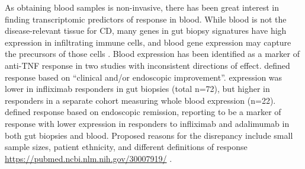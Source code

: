 As obtaining blood samples is non-invasive, there has been great interest in finding transcriptomic predictors of response in blood.
%
While blood is not the disease-relevant tissue for \gls{CD},
many genes in gut biopsy signatures have high expression in infiltrating immune cells, and blood gene expression may capture the precursors of those cells \autocite{gaujoux2019CellcentredMetaanalysisReveals}.
Blood  expression has been identified as a marker of anti-\gls{TNF} response in two studies with inconsistent directions of effect.
\textcite{gaujoux2019CellcentredMetaanalysisReveals} defined response based on  
\enquote{clinical and/or endoscopic improvement}.
 expression was lower in infliximab responders in gut biopsies (total n=72),
but higher in responders in a separate cohort measuring whole blood expression (n=22).
\textcite{verstockt2019LowTREM1Expression} defined response based on endoscopic remission, reporting  to be a marker of response 
with lower expression in responders to infliximab and adalimumab in both gut biopsies and blood.
Proposed reasons for the disrepancy include small sample sizes, patient ethnicity, and different definitions of response \url{https://pubmed.ncbi.nlm.nih.gov/30007919/} \autocite{digby-bell2019InterrogatingHostImmunity}.

